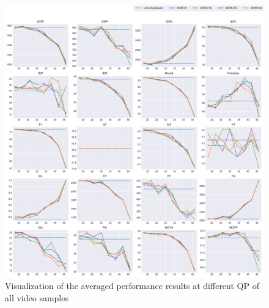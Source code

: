 \begin{figure}[!htbp]
  \centering
  \includegraphics[width=1.0\linewidth]{img/averaged_all_multiplots_qp.pdf}
  \caption[Visualization of the averaged performance results at different QP of all video samples]
  {Visualization of the averaged performance results at different QP of all video samples}
  \label{fig:averaged_result_all_multiplots_qp}
\end{figure}